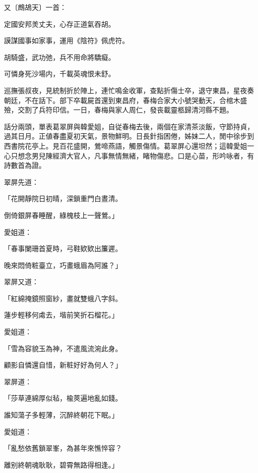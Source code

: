 又〔鷓鴣天〕一首：
\begin{myquote}
定國安邦羙丈夫，心存正道氣吞胡。

謨謀國事如家事，運用《陰符》佩虎符。

胡騎盛，武功弛，兵不用命將驕癡。

可憐身死沙場内，千載英魂恨未舒。
\end{myquote}

巡撫張叔夜，見統制折於陣上，連忙鳴金收軍，查點折傷士卒，退守東昌，星夜奏朝廷，不在話下。部下卒載屍首還到東昌府，春梅合家大小號哭動天，合棺木盛殮，交割了兵符印信。一日，春梅與家人周仁，發丧載靈柩歸清河縣不題。

話分兩頭，單表葛翠屏與韓愛姐，自従春梅去後，兩個在家清茶淡飯，守節持貞，過其日月。正値春盡夏初天氣，景物鮮明。日長針指困倦，姊妹二人，閒中徐步到西書院花亭上。見百花盛開，鶯啼燕語，觸景傷情。葛翠屏心還坦然；這韓愛姐一心只想念男兒陳經濟大官人，凡事無情無緒，睹物傷悲。口是心苗，形吟咏者，有詩數首為證。

翠屏先道：
\begin{myquote}
「花開靜院日初晴，深鎖重門白晝清。

倒倚銀屏春睡醒，綠槐枝上一聲鶯。」
\end{myquote}

愛姐道：
\begin{myquote}
「春事闌珊首夏時，弓鞋欵欵出簾遲。

晚來悶倚粧臺立，巧畫蛾眉為阿誰？」
\end{myquote}

翠屏又道：
\begin{myquote}
「紅綿掩鏡照窗紗，畫就雙蛾八字斜。

蓮步輕移何䖏去，堦前笑折石榴花。」
\end{myquote}

愛姐道：
\begin{myquote}
「雪為容貌玉為神，不遣風流涴此身。

顧影自憐還自惜，新粧好好為何人？」
\end{myquote}

翠屏道：
\begin{myquote}
「莎草連綿厚似毡，楡莢遍地亂如錢。

誰知蕩子多輕薄，沉醉終朝花下眠。」
\end{myquote}

愛姐道：
\begin{myquote}
「亂愁依舊鎖翠峯，為甚年來憔悴容？

離别終朝魂耿耿，碧霄無路得相逢。」
\end{myquote}

